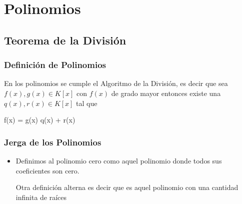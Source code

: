 \documentclass[12pt, fleqn]{report}                             %
\newenvironment{MultiLineEquation*}[1]                          %
        {\begin{equation*}\begin{alignedat}{#1}}                    %
        {\end{alignedat}\end{equation*}}                            %
\begin{document}
\chapter{Polinomios}
    \clearpage

    \section{Teorema de la División}


        \subsection{Definición de Polinomios}

            En los polinomios se cumple el Algoritmo de la División, es decir
            que sea $f(x), g(x) \in K[x]$ con $f(x)$ de grado mayor entonces
            existe una $q(x), r(x) \in K[x]$ tal que
            \begin{MultiLineEquation*}{3}
               f(x) = g(x) \; q(x) + r(x)  
            \end{MultiLineEquation*}


        \subsection{Jerga de los Polinomios}

            \begin{itemize}

                \item
                    Definimos al polinomio cero como aquel polinomio donde todos sus coeficientes son
                    cero.

                    Otra definición alterna es decir que es aquel polinomio con una cantidad infinita de raíces

            \end{itemize}


        \clearpage
\end{document}
